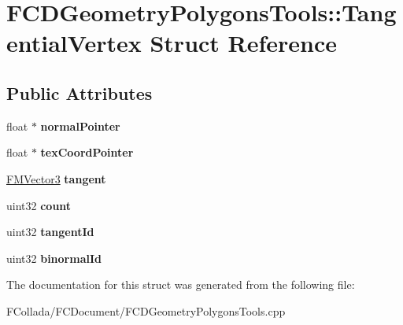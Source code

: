 \hypertarget{structFCDGeometryPolygonsTools_1_1TangentialVertex}{
\section{FCDGeometryPolygonsTools::TangentialVertex Struct Reference}
\label{structFCDGeometryPolygonsTools_1_1TangentialVertex}
}
\subsection*{Public Attributes}
\begin{DoxyCompactItemize}
\item 
\hypertarget{structFCDGeometryPolygonsTools_1_1TangentialVertex_a21cee22c13308ed6a94188d502f753af}{
float $\ast$ {\bfseries normalPointer}}
\label{structFCDGeometryPolygonsTools_1_1TangentialVertex_a21cee22c13308ed6a94188d502f753af}

\item 
\hypertarget{structFCDGeometryPolygonsTools_1_1TangentialVertex_a1bfd50b79d823108a4a090ebc3c00f09}{
float $\ast$ {\bfseries texCoordPointer}}
\label{structFCDGeometryPolygonsTools_1_1TangentialVertex_a1bfd50b79d823108a4a090ebc3c00f09}

\item 
\hypertarget{structFCDGeometryPolygonsTools_1_1TangentialVertex_aba5fe9a0dd4089fa02eacfac43e42590}{
\hyperlink{classFMVector3}{FMVector3} {\bfseries tangent}}
\label{structFCDGeometryPolygonsTools_1_1TangentialVertex_aba5fe9a0dd4089fa02eacfac43e42590}

\item 
\hypertarget{structFCDGeometryPolygonsTools_1_1TangentialVertex_ad6feb38d7f27dbad3afb67db690a7679}{
uint32 {\bfseries count}}
\label{structFCDGeometryPolygonsTools_1_1TangentialVertex_ad6feb38d7f27dbad3afb67db690a7679}

\item 
\hypertarget{structFCDGeometryPolygonsTools_1_1TangentialVertex_a455c5f503f06178d445ef4a4c763c5de}{
uint32 {\bfseries tangentId}}
\label{structFCDGeometryPolygonsTools_1_1TangentialVertex_a455c5f503f06178d445ef4a4c763c5de}

\item 
\hypertarget{structFCDGeometryPolygonsTools_1_1TangentialVertex_af66eecc24f585c8965440aa078bd1edb}{
uint32 {\bfseries binormalId}}
\label{structFCDGeometryPolygonsTools_1_1TangentialVertex_af66eecc24f585c8965440aa078bd1edb}

\end{DoxyCompactItemize}


The documentation for this struct was generated from the following file:\begin{DoxyCompactItemize}
\item 
FCollada/FCDocument/FCDGeometryPolygonsTools.cpp\end{DoxyCompactItemize}
